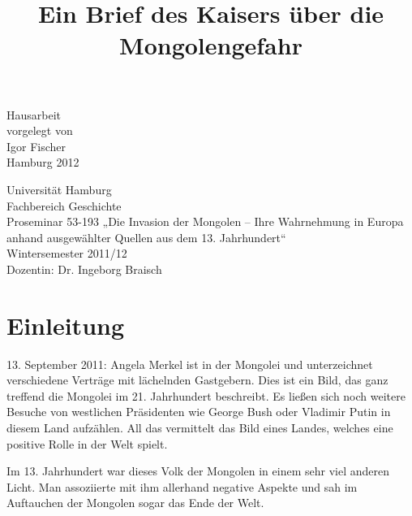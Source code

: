 \documentclass[12pt,headsepline,a4paper]{scrartcl}
\title{}
\author{}
\begin{document}
\begin{titlepage}
\date{}

\title{\Large Ein Brief des Kaisers über die Mongolengefahr}
{\let\newpage\relax\maketitle}

\begin{center}
\vfill
Hausarbeit\\
vorgelegt von\\
Igor Fischer \\
\null
Hamburg 2012
\vfill
\end{center}

\begin{minipage}{0.5\textwidth}
\begin{flushleft} 
Universität Hamburg\\
Fachbereich Geschichte\\
Proseminar 53-193 „Die Invasion der Mongolen – Ihre Wahrnehmung in Europa anhand
ausgewählter Quellen aus dem 13. Jahrhundert“\\
Wintersemester 2011/12\\
Dozentin: Dr. Ingeborg Braisch\\
\end{flushleft}
\end{minipage}
\vline
\begin{minipage}{0.5\textwidth}
\end{minipage}

\end{titlepage}

\tableofcontents
\thispagestyle{empty}
\newpage

\section*{Einleitung}
13. September 2011: Angela Merkel ist in der Mongolei und unterzeichnet
verschiedene Verträge mit lächelnden Gastgebern. Dies ist ein Bild, das ganz treffend
die Mongolei im 21. Jahrhundert beschreibt. Es ließen sich noch weitere Besuche von
westlichen Präsidenten wie George Bush oder Vladimir Putin in diesem Land aufzählen.
All das vermittelt das Bild eines Landes, welches eine positive Rolle in der Welt spielt.

Im 13. Jahrhundert war dieses Volk der Mongolen in einem sehr viel anderen Licht.
Man assoziierte mit ihm allerhand negative Aspekte und sah im Auftauchen der
Mongolen sogar das Ende der Welt.
\end{document}
